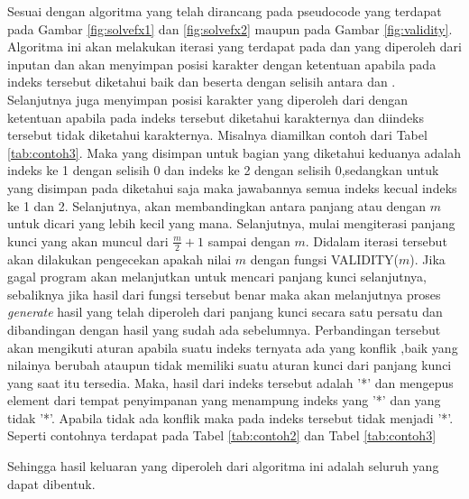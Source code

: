 \indent Sesuai dengan algoritma yang telah dirancang pada pseudocode yang terdapat pada Gambar \ref{fig:solvefx1} dan \ref{fig:solvefx2} maupun pada Gambar \ref{fig:validity}. Algoritma ini akan melakukan iterasi yang terdapat pada \plaintext dan \ciphertext yang diperoleh dari inputan dan akan menyimpan posisi karakter dengan ketentuan apabila pada indeks tersebut diketahui baik \plaintext dan \ciphertext beserta dengan selisih antara \ciphertext dan \plaintext. Selanjutnya juga menyimpan posisi karakter yang diperoleh dari \ciphertext dengan ketentuan apabila \ciphertext pada indeks tersebut diketahui karakternya dan \plaintext diindeks tersebut tidak diketahui karakternya. Misalnya diamilkan contoh dari Tabel \ref{tab:contoh3}. Maka yang disimpan untuk bagian yang diketahui keduanya adalah indeks ke 1 dengan selisih 0 dan indeks ke 2 dengan selisih 0,sedangkan untuk yang disimpan pada diketahui \ciphertext saja maka jawabannya semua indeks kecual indeks ke 1 dan 2. Selanjutnya, akan membandingkan antara panjang \plaintext atau \ciphertext dengan $m$ untuk dicari yang lebih kecil yang mana. Selanjutnya, mulai mengiterasi panjang kunci yang akan muncul dari $\frac{m}{2}+1$ sampai dengan $m$. Didalam iterasi tersebut akan dilakukan pengecekan apakah nilai $m$ dengan fungsi VALIDITY($m$). Jika gagal program akan melanjutkan untuk mencari panjang kunci selanjutnya, sebaliknya jika hasil dari fungsi tersebut benar maka akan melanjutnya proses \textit{generate} hasil yang telah diperoleh dari panjang kunci secara satu persatu dan dibandingan dengan hasil yang sudah ada sebelumnya. Perbandingan tersebut akan mengikuti aturan apabila suatu indeks ternyata ada yang konflik ,baik yang nilainya berubah ataupun tidak memiliki suatu aturan kunci dari panjang kunci yang saat itu tersedia. Maka, hasil dari indeks tersebut adalah '*' dan mengepus element dari tempat penyimpanan yang menampung indeks \plaintext yang '*' dan \ciphertext yang tidak '*'. Apabila tidak ada konflik maka \plaintext pada indeks tersebut tidak menjadi '*'. Seperti contohnya terdapat pada Tabel \ref{tab:contoh2} dan Tabel \ref{tab:contoh3}  


\indent Sehingga hasil keluaran yang diperoleh dari algoritma ini adalah seluruh \plaintext yang dapat dibentuk.

